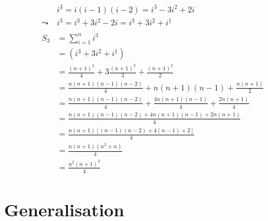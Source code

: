 \documentclass[a4paper]{article}
\theoremstyle{definition}
\begin{document}
\begin{align*}
             & i^{\underline{3}} = i(i-1)(i-2) = i^3 - 3i^2 + 2i                                                      \\
    \leadsto & i^3 = i^{\underline{3}} + 3i^2 - 2i = i^{\underline{3}} + 3i^{\underline{2}} + i^{\underline{1}}       \\
    \\
    S_3      & = \sum_{i=1}^n i^3                                                                                     \\                                                                                                     & = (i^{\underline{3}} + 3i^{\underline{2}} + i^{\underline{1}}) \\
             & = \frac{(n+1)^{\underline{4}}}{4} + 3\frac{(n+1)^{\underline{3}}}{3} + \frac{(n+1)^{\underline{2}}}{2} \\
             & = \frac{n(n+1)(n-1)(n-2)}{4} + n(n+1)(n-1) + \frac{n(n+1)}{2}                                          \\
             & = \frac{n(n+1)(n-1)(n-2)}{4} + \frac{4n(n+1)(n-1)}{4} + \frac{2n(n+1)}{4}                              \\
             & = \frac{n(n+1)(n-1)(n-2) + 4n(n+1)(n-1) +2n(n+1)}{4}                                                   \\
             & = \frac{n(n+1)[(n-1)(n-2) + 4(n-1) + 2]}{4}                                                            \\
             & = \frac{n(n+1)(n^2+n)}{4}                                                                              \\
             & = \frac{n^2(n+1)^2}{4}
\end{align*}

\section{Generalisation}
\end{document}
